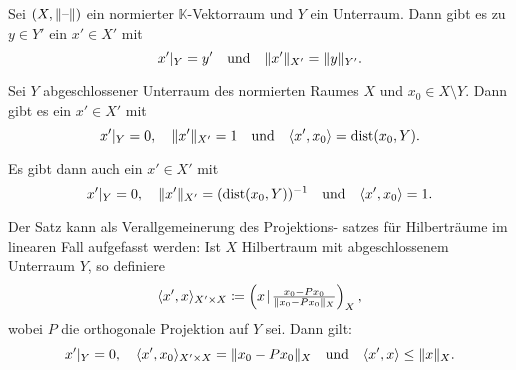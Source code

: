 \documentclass{cheat-sheet}
\newcommand{\K}{\mathbb{K}}
\newcommand{\dist}{\mathrm{dist}} %
\newcommand{\scp}[2]{\left( #1 \!\mid\! #2 \right)} %
\begin{document}
\iffalse
\begin{satz}(Hahn-Banach für lineare Funktionale)
  Sei $X$ ein $\R$-VR, $Y \subset X$ ein Unterraum, $p : X \to \R$ linear und $f : Y \to \R$ linear, sodass $f(x) \leq p(x)$ für alle $x \in Y$. Dann existiert eine lineare Abbildung $F : X \to \R$ mit $f = F|_Y \text{ und } F \leq p$.
\end{satz}
\fi

\begin{kor}
  Sei $(X, \lVert\text{--}\rVert)$ ein normierter $\K$-Vektorraum und $Y$ ein Unterraum. Dann gibt es zu $y \in Y'$ ein $x' \in X'$ mit
  \[
    x'|_Y = y'
    \quad \text{und} \quad
    \lVert x'\rVert_{X'} = \lVert y\rVert_{Y'}.
  \]
\end{kor}

\begin{satz}
  Sei $Y$ abgeschlossener Unterraum des normierten Raumes $X$ und $x_0 \in X \setminus Y$. Dann gibt es ein $x' \in X'$ mit
  \[
    x'|_Y = 0, \quad
    \norm{x'}_{X'} = 1
    \quad \text{und} \quad
    \langle x', x_0 \rangle = \dist(x_0, Y).
  \]
\end{satz}

\begin{satz}
  Es gibt dann auch ein $x' \in X'$ mit
  \[
    x'|_Y = 0, \quad
    \norm{x'}_{X'} = (\dist(x_0, Y))^{-1}
    \quad \text{und} \quad
    \langle x', x_0 \rangle = 1.
  \]
\end{satz}

\begin{bem}
  Der Satz kann als Verallgemeinerung des Projektions- satzes für Hilberträume im linearen Fall aufgefasst werden: Ist $X$ Hilbertraum mit abgeschlossenem Unterraum $Y$, so definiere
  \[ \langle x', x \rangle_{X' {\times} X} \coloneqq \scp{x}{\tfrac{x_0 - Px_0}{\norm{x_0 - Px_0}_X}}_X, \]
  wobei $P$ die orthogonale Projektion auf $Y$ sei. Dann gilt:
  \[
    x'|_Y = 0, \quad
    \langle x', x_0 \rangle_{X' {\times} X} = \lVert x_0 - Px_0\rVert_X
    \quad \text{und} \quad
    \langle x', x \rangle \leq \lVert x\rVert_X.
  \]
\end{bem}
\end{document}
